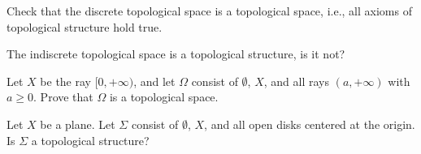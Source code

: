 \begin{majorEx}
    Check that the discrete topological space is a topological space, i.e., all
    axioms of topological structure hold true.
\end{majorEx}

\begin{majorEx}
    The indiscrete topological space is a topological structure, is it not?
\end{majorEx}

\begin{minorEx}
    Let $X$ be the ray $[0, +\infty)$, and let $\Omega$ consist of $\emptyset$,
        $X$, and all rays $(a, +\infty)$ with $a \geq 0$. Prove that $\Omega$ is
        a topological space.
\end{minorEx}

\begin{minorEx}
    Let $X$ be a plane. Let $\Sigma$ consist of $\emptyset$, $X$, and all open
    disks centered at the origin. Is $\Sigma$ a topological structure?
\end{minorEx}
